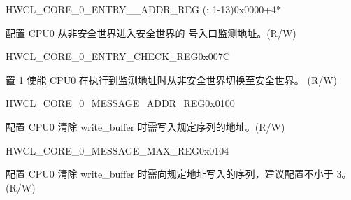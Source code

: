 \begin{register}{H}{WCL\_CORE\_0\_ENTRY\_\_ADDR\_REG (: 1-13)}{0x0000+4*}\label{regdesc:WCLCORE0ENTRYnADDRREG}
%
\regnewline%
\begin{regdesc}\begin{reglist}
\label{fielddesc:WCLCORE0ENTRY1ADDR}\item [WCL\_CORE\_0\_ENTRY\_\regindex{n}\_ADDR] 配置 CPU0 从非安全世界进入安全世界的  号入口监测地址。(R/W)
\end{reglist}\end{regdesc}
\end{register}


\begin{register}{H}{WCL\_CORE\_0\_ENTRY\_CHECK\_REG}{0x007C}\label{regdesc:WCLCORE0ENTRYCHECKREG}
%
%
%
\regnewline%
\begin{regdesc}\begin{reglist}
\label{fielddesc:WCLCORE0ENTRYCHECK}\item [WCL\_CORE\_0\_ENTRY\_CHECK] 置 1 使能 CPU0 在执行到监测地址时从非安全世界切换至安全世界。 (R/W)
\end{reglist}\end{regdesc}
\end{register}


\begin{register}{H}{WCL\_CORE\_0\_MESSAGE\_ADDR\_REG}{0x0100}\label{regdesc:WCLCORE0MESSAGEADDRREG}
%
\regnewline%
\begin{regdesc}\begin{reglist}
\label{fielddesc:WCLCORE0MESSAGEADDR}\item [WCL\_CORE\_0\_MESSAGE\_ADDR] 配置 CPU0 清除 write\_buffer 时需写入规定序列的地址。(R/W)
\end{reglist}\end{regdesc}
\end{register}


\begin{register}{H}{WCL\_CORE\_0\_MESSAGE\_MAX\_REG}{0x0104}\label{regdesc:WCLCORE0MESSAGEMAXREG}
%
%
\regnewline%
\begin{regdesc}\begin{reglist}
\label{fielddesc:WCLCORE0MESSAGEMAX}\item [WCL\_CORE\_0\_MESSAGE\_MAX] 配置 CPU0 清除 write\_buffer 时需向规定地址写入的序列，建议配置不小于 3。(R/W)
\end{reglist}\end{regdesc}
\end{register}


